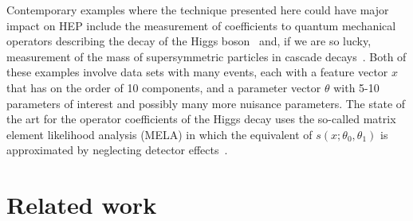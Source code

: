 \documentclass[12pt]{article}
\numberwithin{equation}{section}
\theoremstyle{plain}
\begin{document}
Contemporary examples where the technique presented here could have major impact
on HEP include the measurement of coefficients to quantum mechanical operators
describing the decay of the Higgs boson~\citep{Chen:2014pia} and, if we are so
lucky, measurement of the mass of supersymmetric particles in cascade
decays~\citep{Allanach:2000kt}.  Both of these examples involve data sets with
many events, each with a feature vector $x$ that has on the order of 10
components, and a parameter vector $\theta$ with 5-10 parameters of interest and
possibly many more nuisance parameters. The state of the art for the operator
coefficients of the Higgs decay uses the so-called matrix element likelihood
analysis (MELA) in which the equivalent of $s(x; \theta_0, \theta_1)$ is
approximated by neglecting detector effects~\citep{Gao:2010qx,Bolognesi:2012mm}.



\section{Related work}
\label{sec:related}
\end{document}

